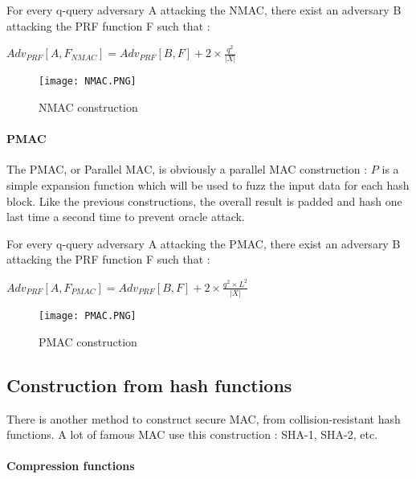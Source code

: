 \begin{mytheorem}
	For every q-query adversary A attacking the NMAC, there exist an adversary B attacking the PRF function F such that : 
	\begin{flushright}
 		$Adv_{PRF}[A,F_{NMAC}] = Adv_{PRF}[B, F] + 2\times \frac{q^2}{|X|}$	
	\end{flushright}
\end{mytheorem}

\begin{figure}[!ht]
	\centering
		\texttt{[image: NMAC.PNG]}
	\caption{NMAC construction}
	\label{fig:NMACConstruction}
\end{figure}

\paragraph{PMAC}

The PMAC, or Parallel MAC, is obviously a parallel MAC construction : $P$ is a simple expansion function which will be used to fuzz the input data for each hash block. Like the previous constructions, the overall result is padded and hash one last time a second time to prevent oracle attack.

\begin{mytheorem}
	For every q-query adversary A attacking the PMAC, there exist an adversary B attacking the PRF function F such that : 
	\begin{flushright}
 		$Adv_{PRF}[A,F_{PMAC}] = Adv_{PRF}[B, F] + 2\times \frac{q^2\times L^2}{|X|}$	
	\end{flushright}
\end{mytheorem}

\begin{figure}[!ht]
	\centering
		\texttt{[image: PMAC.PNG]}
	\caption{PMAC construction}
	\label{fig:PMACConstruction}
\end{figure}

\subsection{Construction from hash functions}

There is another method to construct secure MAC, from collision-resistant hash functions. A lot of famous MAC use this construction : SHA-1, SHA-2, etc.

\paragraph{Compression functions}

